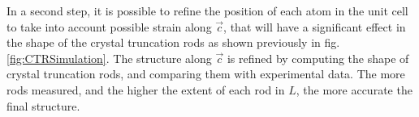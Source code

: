 In a second step, it is possible to refine the position of each atom in the unit cell to take into account possible strain along $\vec{c}$, that will have a significant effect in the shape of the crystal truncation rods as shown previously in fig. \ref{fig:CTRSimulation}.
The structure along $\vec{c}$ is refined by computing the shape of crystal truncation rods, and comparing them with experimental data.
The more rods measured, and the higher the extent of each rod in $L$, the more accurate the final structure.
